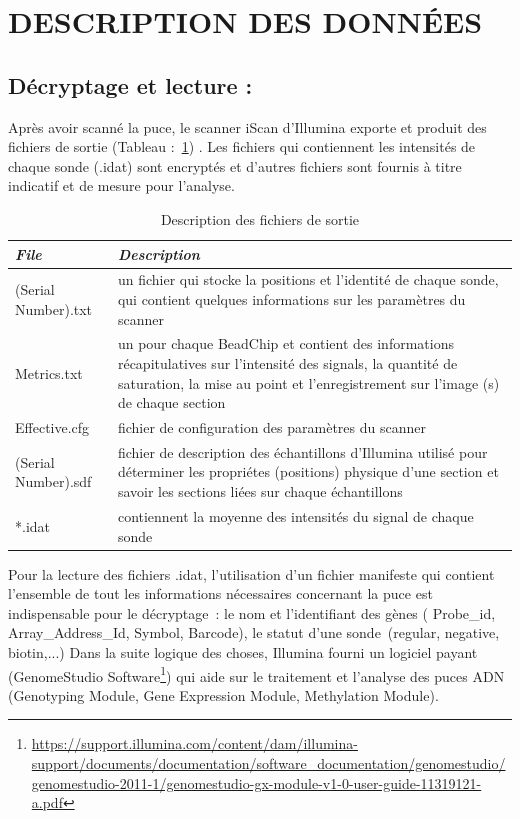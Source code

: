 \documentclass[a4paper,10pt]{article}
\begin{document}
\section{DESCRIPTION DES DONN\'{E}ES }
\subsection{ Décryptage et lecture :}
Après avoir scanné la puce, le scanner iScan d’Illumina exporte et produit des fichiers de sortie (Tableau :~\ref{Fichiers_Sorties}) .
Les fichiers qui contiennent les intensités de chaque sonde (.idat) sont encryptés et d’autres fichiers sont fournis à titre indicatif et de mesure pour l’analyse.\\
\begin{table}[!ht]
\begin{tabular}{|p{3cm}|p{9cm}|}
\hline
\emph{File}  & \emph{Description} \\
\hline
 (Serial Number).txt & un fichier qui stocke la positions et l'identité de chaque sonde, qui contient quelques informations sur les paramètres du scanner\\
\hline
Metrics.txt &  un pour chaque BeadChip  et contient des informations récapitulatives sur l'intensité des signals,
la quantité de saturation, la mise au point et l'enregistrement sur l'image (s) de chaque section \\
\hline 
Effective.cfg & fichier de configuration des paramètres du scanner\\
\hline
(Serial Number).sdf & fichier de description des échantillons d'Illumina utilisé pour déterminer les propriétes (positions)
physique d'une section et savoir les sections liées sur chaque échantillons\\
\hline
*.idat & contiennent la moyenne des intensités du signal de chaque sonde \\
\hline
\end{tabular}
\caption{Description des fichiers de sortie}
\label{Fichiers_Sorties}
\end{table}
\newline
Pour la lecture  des fichiers .idat, l’utilisation d’un fichier manifeste qui contient l’ensemble de tout les informations nécessaires concernant la puce est indispensable pour le décryptage : le nom et l’identifiant  des gènes ( Probe\_id, Array\_Address\_Id, Symbol, Barcode), le statut d’une sonde (regular, negative, biotin,...)
Dans la suite logique des choses, Illumina fourni un logiciel payant (GenomeStudio Software\footnote{\url{https://support.illumina.com/content/dam/illumina-support/documents/documentation/software\_documentation/genomestudio/genomestudio-2011-1/genomestudio-gx-module-v1-0-user-guide-11319121-a.pdf}})  qui aide sur le traitement et l'analyse des puces ADN (Genotyping Module, Gene Expression Module, Methylation Module).
\end{document}
